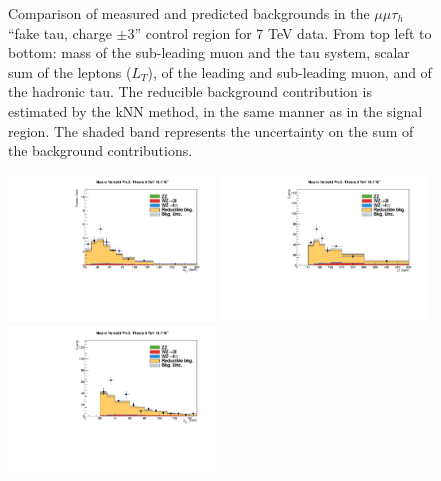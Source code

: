 \begin{figure}
\begin{center}
  \caption{Comparison of measured and predicted backgrounds in the $\mu\mu\tau_h$ ``fake tau, charge $\pm3$'' control region for 7 TeV data.
  From top left to bottom: mass of the sub-leading muon and the tau system, scalar sum of the leptons \pT ($L_T$), \pT of the leading and sub-leading muon, and \pT of the hadronic tau.
  The reducible background contribution is estimated by the kNN method, in the same manner as in the signal region.
  The shaded band represents the uncertainty on the sum of the background contributions.
  }
  \label{fig:LLT_mmt_f3_charge3_control_7TeV}
\end{center}
\end{figure}

\begin{figure}
\begin{center}
  \includegraphics[width=0.49\textwidth]{4_Analisys/pics/8TeV/plots/mmt/f3/Full_charge3/final-f3-subMass-Full.pdf}
  \includegraphics[width=0.49\textwidth]{4_Analisys/pics/8TeV/plots/mmt/f3/final-LT-charge3.pdf}\\
  \includegraphics[width=0.49\textwidth]{4_Analisys/pics/8TeV/plots/mmt/f3/Full_charge3/final-f3-m1Pt-Full.pdf}

\end{center}
\end{figure}
